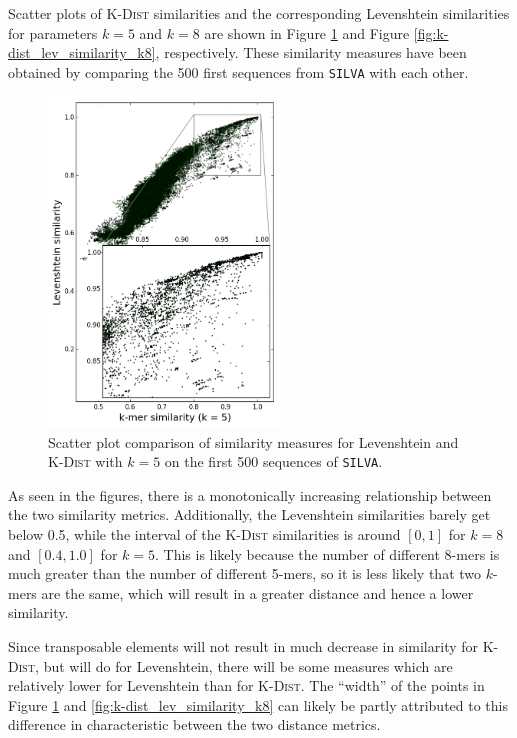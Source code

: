 Scatter plots of \textsc{K-Dist} similarities and the corresponding Levenshtein
similarities for parameters $k=5$ and $k=8$ are shown in Figure
\ref{fig:k-dist_lev_similarity_k5} and Figure
\ref{fig:k-dist_lev_similarity_k8}, respectively. These similarity measures
have been obtained by comparing the 500 first sequences from \texttt{SILVA}
with each other.

\begin{figure}
  \includegraphics[width=0.55\textwidth]{graphics/Levenshtein_K-Dist_k5.png}
  \caption{Scatter plot comparison of similarity measures for Levenshtein and
    \textsc{K-Dist} with $k=5$ on the first 500 sequences of \texttt{SILVA}.}
  \label{fig:k-dist_lev_similarity_k5}
\end{figure}

As seen in the figures, there is a monotonically increasing relationship
between the two similarity metrics. Additionally, the Levenshtein similarities
barely get below 0.5, while the interval of the \textsc{K-Dist} similarities is
around $[0,1]$ for $k=8$ and $[0.4,1.0]$ for $k=5$. This is likely because the
number of different 8-mers is much greater than the number of different 5-mers,
so it is less likely that two $k$-mers are the same, which will result in a
greater distance and hence a lower similarity.

Since transposable elements will not result in much decrease in similarity for
\textsc{K-Dist}, but will do for Levenshtein, there will be some measures which
are relatively lower for Levenshtein than for \textsc{K-Dist}. The ``width'' of
the points in Figure \ref{fig:k-dist_lev_similarity_k5} and
\ref{fig:k-dist_lev_similarity_k8} can likely be partly attributed to this
difference in characteristic between the two distance metrics.


